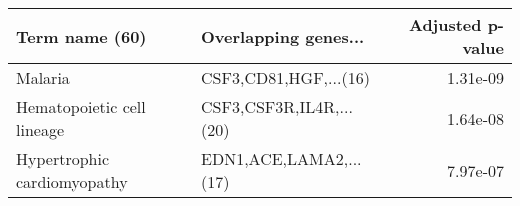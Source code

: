\begin{tabular}{llr}
\toprule
             Term name (60) &    Overlapping genes... &  Adjusted p-value \\
\midrule
                    Malaria &   CSF3,CD81,HGF,...(16) &          1.31e-09 \\
 Hematopoietic cell lineage & CSF3,CSF3R,IL4R,...(20) &          1.64e-08 \\
Hypertrophic cardiomyopathy &  EDN1,ACE,LAMA2,...(17) &          7.97e-07 \\
\bottomrule
\end{tabular}
